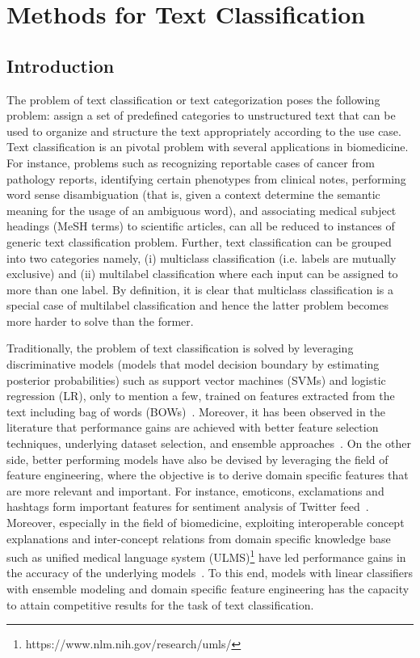 \chapter{Methods for Text Classification}\label{chap:nnmethod}

\section{Introduction}

The problem of text classification or text categorization poses the following problem: assign a set of predefined categories to unstructured text that can be used to organize and structure the text appropriately according to the use case. Text classification is an pivotal problem with several applications in biomedicine. For instance, problems such as recognizing reportable cases of cancer from pathology reports, identifying certain phenotypes from clinical notes, performing word sense disambiguation (that is, given a context determine the semantic meaning for the usage of an ambiguous word), and associating medical subject headings (MeSH terms) to scientific articles, can all be reduced to instances of generic text classification problem. Further, text classification can be grouped into two categories namely, (i) multiclass classification (i.e. labels are mutually exclusive) and (ii) multilabel classification where each input can be assigned to more than one label. By definition, it is clear that multiclass classification is a special case of multilabel classification and hence the latter problem becomes more harder to solve than the former.


Traditionally, the problem of text classification is solved by leveraging discriminative models (models that model decision boundary by estimating posterior probabilities) such as support vector machines (SVMs) and logistic regression (LR), only to mention a few, trained on features extracted from the text including bag of words (BOWs)~\cite{sebastiani2005text}. Moreover, it has been observed in the literature that performance gains are achieved with better feature selection techniques, underlying dataset selection, and ensemble approaches~\cite{zhou2012ensemble}. On the other side, better performing models have also be devised by leveraging the field of feature engineering, where the objective is to derive domain specific features that are more relevant and important. For instance, emoticons, exclamations and hashtags form important features for sentiment analysis of Twitter feed~\cite{kiritchenko2014sentiment}. Moreover, especially in the field of biomedicine, exploiting interoperable concept explanations and inter-concept relations from domain specific knowledge base such as unified medical language system (ULMS)\footnote{https://www.nlm.nih.gov/research/umls/} have led performance gains in the accuracy of the underlying models~\cite{yepes2015knowledge}. To this end, models with linear classifiers with ensemble modeling and domain specific feature engineering has the capacity to attain competitive results for the task of text classification.

